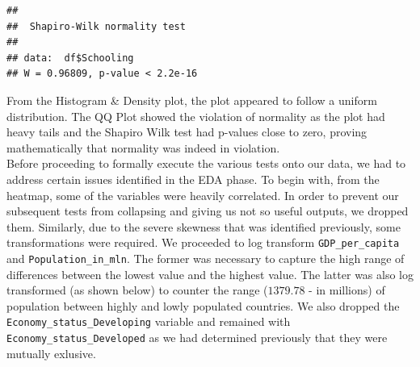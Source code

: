 \documentclass[
  10pt,
]{article}
\newenvironment{Shaded}{\begin{snugshade}}{\end{snugshade}}
\newcommand{\CommentTok}[1]{\textcolor[rgb]{0.56,0.35,0.01}{\textit{#1}}}
\newcommand{\FunctionTok}[1]{\textcolor[rgb]{0.13,0.29,0.53}{\textbf{#1}}}
\newcommand{\NormalTok}[1]{#1}
\newcommand{\SpecialCharTok}[1]{\textcolor[rgb]{0.81,0.36,0.00}{\textbf{#1}}}
\begin{document}
\begin{Shaded}
\end{Shaded}

\begin{verbatim}
## 
##  Shapiro-Wilk normality test
## 
## data:  df$Schooling
## W = 0.96809, p-value < 2.2e-16
\end{verbatim}

From the Histogram \& Density plot, the plot appeared to follow a
uniform distribution. The QQ Plot showed the violation of normality as
the plot had heavy tails and the Shapiro Wilk test had p-values close to
zero, proving mathematically that normality was indeed in violation.\\

Before proceeding to formally execute the various tests onto our data,
we had to address certain issues identified in the EDA phase. To begin
with, from the heatmap, some of the variables were heavily correlated.
In order to prevent our subsequent tests from collapsing and giving us
not so useful outputs, we dropped them. Similarly, due to the severe
skewness that was identified previously, some transformations were
required. We proceeded to log transform \texttt{GDP\_per\_capita} and
\texttt{Population\_in\_mln}. The former was necessary to capture the
high range of differences between the lowest value and the highest
value. The latter was also log transformed (as shown below) to counter
the range (\(1379.78\) - in millions) of population between highly and
lowly populated countries. We also dropped the
\texttt{Economy\_status\_Developing} variable and remained with
\texttt{Economy\_status\_Developed} as we had determined previously that
they were mutually exlusive.\\
\end{document}
